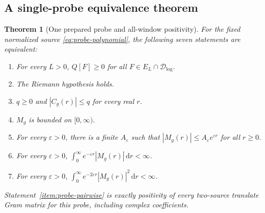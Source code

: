 \documentclass[11pt]{article}
\numberwithin{equation}{section}
\newtheorem{theorem}{Theorem}[section]
\theoremstyle{definition}
\theoremstyle{remark}
\newcommand{\dd}{\,\mathrm d}
\begin{document}
\subsection{A single-probe equivalence theorem}
\label{sec:probe-equivalence}

\begin{theorem}[One prepared probe and all-window positivity]
\label{thm:probe-equivalence}
For the fixed normalized source \eqref{eq:probe-polynomial}, the
following seven statements are equivalent:
\begin{enumerate}[label=\textup{(\roman*)}]
\item\label{item:probe-all-window}
For every \(L>0\), \(Q[F]\ge0\) for all
\(F\in E_L\cap\mathcal D_{\log}\).
\item\label{item:probe-rh} The Riemann hypothesis holds.
\item\label{item:probe-pairwise}
\(q\ge0\) and \(|C_g(r)|\le q\) for every real \(r\).
\item\label{item:probe-bounded} \(M_g\) is bounded on \([0,\infty)\).
\item\label{item:probe-subexponential}
For every \(\varepsilon>0\), there is a finite
\(A_\varepsilon\) such that
\(|M_g(r)|\le A_\varepsilon e^{\varepsilon r}\) for all \(r\ge0\).
\item\label{item:probe-l1}
For every \(\varepsilon>0\),
\(\int_0^\infty e^{-\varepsilon r}|M_g(r)|\dd r<\infty\).
\item\label{item:probe-l2}
For every \(\varepsilon>0\),
\(\int_0^\infty e^{-2\varepsilon r}|M_g(r)|^2\dd r<\infty\).
\end{enumerate}
Statement~\ref{item:probe-pairwise} is exactly positivity of every
two-source translate Gram matrix for this probe, including complex
coefficients.
\end{theorem}
\end{document}

